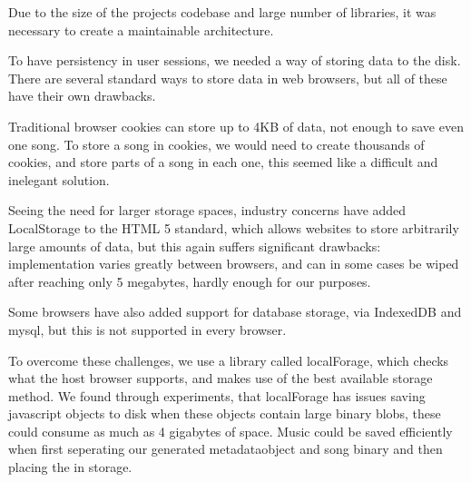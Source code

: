 Due to the size of the projects codebase and large number of libraries, it was necessary to create a maintainable architecture.



To have persistency in user sessions, we needed a way of storing data to the disk. There are several standard ways to store data in web browsers, but all of these have their own drawbacks.

Traditional browser cookies can store up to 4KB of data, 
not enough to save even one song. 
To store a song in cookies, 
we would need to create thousands of cookies, 
and store parts of a song in each one, 
this seemed like a difficult and inelegant solution.

Seeing the need for larger storage spaces, 
industry concerns have added LocalStorage to the HTML 5 standard,
which allows websites to store arbitrarily large amounts of data,
but this again suffers significant drawbacks: 
implementation varies greatly between browsers, 
and can in some cases be wiped after reaching only 5 megabytes, 
hardly enough for our purposes.

Some browsers have also added support for database storage, via IndexedDB and mysql, but this is not supported in every browser.

To overcome these challenges, we use a library called localForage, 
which checks what the host browser supports,
and makes use of the best available storage method.
We found through experiments,
that localForage has issues saving javascript objects to disk when these objects contain large binary blobs, 
these could consume as much as 4 gigabytes of space.
Music could be saved efficiently when first seperating our generated metadataobject and song binary and then placing the in storage.




